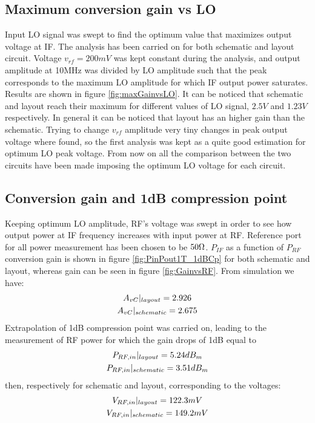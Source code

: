 \subsection{Maximum conversion gain vs LO}
Input LO signal was swept to find the optimum value that maximizes output voltage at IF. The analysis has been carried on for both schematic and layout circuit. Voltage \(v_{rf}=200mV\) was kept constant during the analysis, and output amplitude at 10MHz was divided by LO amplitude such that the peak corresponds to the maximum LO amplitude for which IF output power saturates. Results are shown in figure \ref{fig:maxGainvsLO}. It can be noticed that schematic and layout reach their maximum for different values of LO signal, \(2.5V\) and \(1.23V\) respectively. 
In general it can be noticed that layout has an higher gain than the schematic. Trying to change \(v_{rf}\) amplitude very tiny changes in peak output voltage where found, so the first analysis was kept as a quite good estimation for optimum LO peak voltage. From now on all the comparison between the two circuits have been made imposing the optimum LO voltage for each circuit.

\subsection{Conversion gain and 1dB compression point}
Keeping optimum LO amplitude, RF's voltage was swept in order to see how output power at IF frequency increases with input power at RF. Reference port for all power measurement has been chosen to be \(50\ohm\). \(P_{IF}\) as a function of \(P_{RF}\) conversion gain is shown in figure \ref{fig:PinPout1T_1dBCp} for both schematic and layout, whereas gain can be seen in figure \ref{fig:GainvsRF}. 
From simulation we have:
\begin{gather}
A_{vC}|_{layout}=2.926 \notag \\ 
A_{vC}|_{schematic}=2.675 \notag
\end{gather}
Extrapolation of 1dB compression point was carried on, leading to the measurement of RF power for which the gain drops of 1dB equal to 
\begin{gather}
P_{RF,in}|_{layout}=5.24dB_{m} \notag \\
P_{RF,in}|_{schematic}=3.51dB_{m} \notag
\end{gather}
then, respectively for schematic and layout, corresponding to the voltages:
\begin{gather}
V_{RF,in}|_{layout}=122.3mV \notag \\
V_{RF,in}|_{schematic}=149.2mV \notag
\end{gather}



